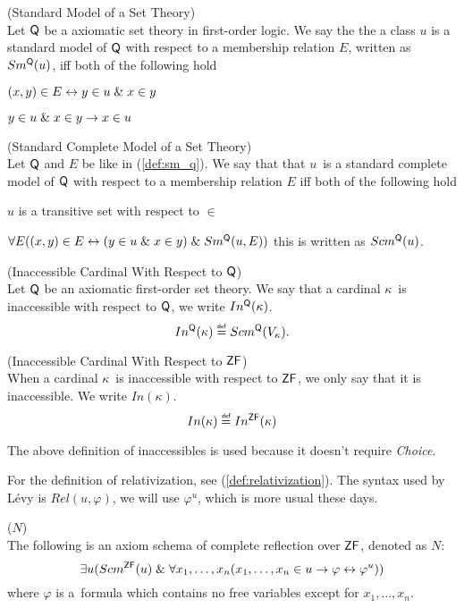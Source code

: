 \begin{definition}{(Standard Model of a Set Theory)}\label{def:sm_q}\\
Let $\sf{Q}$ be a axiomatic set theory in first-order logic. We say the the a class $u$ is a standard model of $\sf{Q}$ with respect to a membership relation $E$, written as $Sm^{\sf{Q}}(u)$, iff both of the following hold
\bce[(i)]
\item $(x, y) \in E \leftrightarrow y \in u \mathrel{\&} x \in y$
\item $y \in u \mathrel{\&} x \in y \rightarrow x \in u$
\ece
\end{definition}
\begin{definition}{(Standard Complete Model of a Set Theory)}\label{def:scm_q}\\
Let $\sf{Q}$ and $E$ be like in (\ref{def:sm_q}). We say that that $u$ is a standard complete model of $\sf{Q}$ with respect to a membership relation $E$ iff both of the following hold
\bce[(i)]
\item $u$ is a transitive set with respect to $\in$
\item $\forall E ((x, y) \in E \leftrightarrow (y \in u \mathrel{\&} x \in y) \mathrel{\&} Sm^{\sf{Q}}(u, E))$
\ece
this is written as $Scm^{\sf{Q}}(u)$.
\end{definition}

\begin{definition}{(Inaccessible Cardinal With Respect to $\sf{Q}$)}\label{def:levy_inaccessible_q}\\
Let $\sf{Q}$ be an axiomatic first-order set theory. We say that a cardinal $\kappa$ is inaccessible with respect to $\sf{Q}$, we write $In^{\sf{Q}}(\kappa)$.
\begin{equation}
In^{\sf{Q}}(\kappa) \defeq Scm^{\sf{Q}}(V_\kappa).
\end{equation}
\end{definition}

\begin{definition}{(Inaccessible Cardinal With Respect to $\sf{ZF}$)}\label{def:levy_inaccessible}\\
When a cardinal $\kappa$ is inaccessible with respect to $\sf{ZF}$, we only say that it is inaccessible. We write $In(\kappa)$.
\begin{equation}
In(\kappa) \defeq In^{\sf{ZF}}(\kappa)
\end{equation}
\end{definition}
The above definition of inaccessibles is used because it doesn't require \emph{Choice}.

For the definition of relativization, see (\ref{def:relativization}). The syntax used by Lévy is $Rel(u, \varphi)$, we will use $\varphi^{u}$, which is more usual these days.
\begin{definition}{($N$)}\label{def:levy_axiom_n}\\
The following is an axiom schema of complete reflection over $\sf{ZF}$, denoted as $N$:
\begin{equation}
\exists u (Scm^{\sf{ZF}}(u) \mathrel{\&} \forall x_1, \ldots , x_n (x_1, \ldots , x_n \in u \rightarrow \varphi \leftrightarrow \varphi^{u}))
\end{equation}
where $\varphi$ is a~formula which contains no free variables except for $x_1, \ldots , x_n$.
\end{definition}

